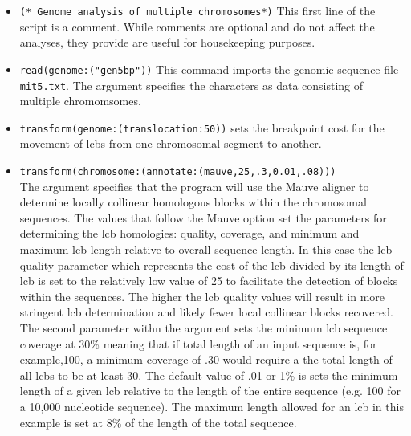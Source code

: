 \begin{itemize}
\item \texttt{(* Genome analysis of multiple chromosomes*)} This first line of the script is a comment. While comments are optional and do not affect the analyses, they provide are useful for housekeeping purposes.
\item \texttt{read(genome:("gen5bp"))} This command imports the genomic sequence file \texttt{mit5.txt}. The argument  specifies the characters as data consisting of multiple chromomsomes.
\item \texttt{transform(genome:(translocation:50))} sets the breakpoint cost for the movement of lcbs from one chromosomal segment to another. 
\item \texttt{transform(chromosome:(annotate:(mauve,25,.3,0.01,.08)))} \\The argument  specifies that the program will use the Mauve aligner \cite{darlingetal2004} to determine locally collinear homologous blocks within the chromosomal sequences.  The values that follow the Mauve option set the parameters for determining the lcb homologies: quality, coverage, and minimum and maximum lcb length relative to overall sequence length. In this case the lcb quality parameter which represents the cost of the lcb divided by its length of lcb is set to the relatively low value of 25 to facilitate the detection of blocks within the sequences.  The higher the lcb quality values will result in more stringent lcb determination and likely fewer local collinear blocks recovered.  The second parameter withn the argument  sets the minimum lcb sequence coverage at 30\% meaning that if total length of an input sequence is, for example,100, a minimum coverage of .30 would require a the total length of all lcbs to be at least 30. The default value of .01 or 1\% is sets the minimum length of a given lcb relative to the length of the entire sequence (e.g. 100 for a 10,000 nucleotide sequence). The maximum length allowed for an lcb in this example is set at 8\% of the length of the total sequence.

\end{itemize}
